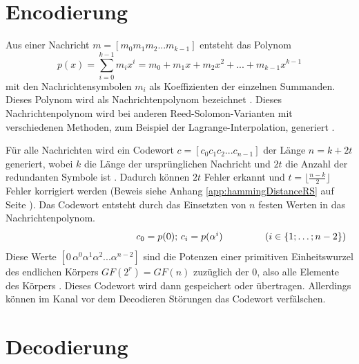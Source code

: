 \section{Encodierung}\label{sec:encoding}

Aus einer Nachricht  $m=[m_{0}m_{1}m_{2}...m_{k-1}]$ entsteht das Polynom \[p(x)=\sum_{i=0}^{k-1}m_ix^i=m_0+m_1x+m_2x^2+...+m_{k-1}x^{k-1}\] mit den Nachrichtensymbolen $m_i$ als Koeffizienten der einzelnen Summanden.
Dieses Polynom wird  als Nachrichtenpolynom bezeichnet \cite{reedPolynomialCodesCertain1960}.
Dieses Nachrichtenpolynom wird bei anderen Reed-Solomon-Varianten mit verschiedenen Methoden, zum Beispiel der Lagrange-Interpolation, generiert \cite{wendlingIntroductionReedSolomon2017}.

Für alle Nachrichten wird ein Codewort $c=[c_{0}c_{1}c_{2}...c_{n-1}]$ der Länge $n=k+2t$ generiert, wobei $k$ die Länge der ursprünglichen Nachricht und $2t$ die Anzahl der redundanten Symbole ist \cite{verbeureReedSolomonErrorCorrecting2022}. 
Dadurch können $2t$ Fehler erkannt und $t=\lfloor\frac{n-k}{2}\rfloor$ Fehler korrigiert werden (Beweis siehe Anhang \ref{app:hammingDistanceRS} auf Seite \pageref{app:hammingDistanceRS}).
Das Codewort entsteht durch das Einsetzten von $n$ festen Werten in das Nachrichtenpolynom.
\[
\makebox[\linewidth]{%
	\hfill
	$c_0=p(0);\,c_i=p(\alpha^i)$\hfill
	\llap{($i\in\{1;\dots;n-2\}$)}%
}
\]
Diese Werte $[0\,\alpha^0 \alpha^1 \alpha^2...\alpha^{n-2}]$ sind die Potenzen einer primitiven Einheitswurzel des endlichen Körpers $GF(2^r)=GF(n)$ zuzüglich der 0, also alle Elemente des Körpers \cite[Kapitel 3]{weitzKonkreteMathematikNicht2021}.
Dieses Codewort wird dann gespeichert oder übertragen.
Allerdings können im Kanal vor dem Decodieren Störungen das Codewort verfälschen.

\section{Decodierung}\label{sec:decoding}

